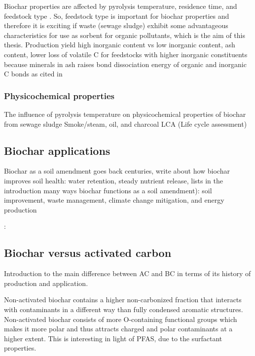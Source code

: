Biochar properties are affected by pyrolysis temperature, residence time, and feedstock type \citep{Ahmad2014}. So, feedstock type is important for biochar properties and therefore it is exciting if waste (sewage sludge) exhibit some advantageous characteristics for use as sorbent for organic pollutants, which is the aim of this thesis. 
\citep{Li2019}
Production yield high inorganic content vs low inorganic content, ash content, lower loss of volatile C for feedstocks with higher inorganic constituents because minerals in ash raises bond dissociation energy of organic and inorganic C bonds \citep{Cantrell2012,Enders2012} as cited in \citep{Ahmad2014}

\subsubsection{Physicochemical properties}
The influence of pyrolysis temperature on physicochemical properties of biochar from sewage sludge \citep{Figueiredo2018}
Smoke/steam, oil, and charcoal
LCA (Life cycle assessment)

\subsection{Biochar applications}
Biochar as a soil amendment goes back centuries, write about how biochar improves soil health: water retention, steady nutrient release,  \citep{Ahmad2014} lists in the introduction many ways biochar functions as a soil amendment): soil improvement, waste management, climate change mitigation, and energy production

\citep{Ahmad2014}:

\subsection{Biochar versus activated carbon}\label{sec:BCvsAC}
Introduction to the main difference between AC and BC in terms of its history of production and application. 

Non-activated biochar contains a higher non-carbonized fraction that interacts with contaminants in a different way than fully condensed aromatic structures. Non-activated biochar consists of more O-containing functional groups which makes it more polar and thus attracts charged and polar contaminants at a higher extent. This is interesting in light of PFAS, due to the surfactant properties. 

